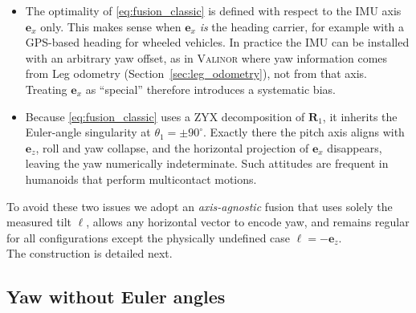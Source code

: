 \documentclass{IJCAS}
\begin{document}
\begin{itemize}[leftmargin=0em]
\item The optimality of \eqref{eq:fusion_classic} is defined with
      respect to the IMU axis $\boldsymbol{e}_{x}$ only.  
      This makes sense when $\boldsymbol{e}_{x}$ \emph{is} the heading
      carrier, for example with a GPS-based heading for wheeled vehicles.  
      In practice the IMU can be installed with an arbitrary yaw
      offset, as in {\scshape{Valinor}} where yaw information comes from Leg odometry
      (Section~\ref{sec:leg_odometry}), not from
      that axis.  Treating $\boldsymbol{e}_{x}$ as ``special'' therefore
      introduces a systematic bias.

\item Because \eqref{eq:fusion_classic} uses a ZYX decomposition of
      $\boldsymbol{R}_{1}$, it inherits the Euler-angle singularity at
      $\theta_{1}= \pm 90^{\circ}$.  
      Exactly there the pitch axis aligns with
      $\boldsymbol{e}_{z}$, roll and yaw collapse, and the horizontal
      projection of $\boldsymbol{e}_{x}$ disappears, leaving the yaw
      numerically indeterminate.  
      Such attitudes are frequent in humanoids that perform
      multicontact motions.
\end{itemize}
To avoid these two issues we adopt an \emph{axis-agnostic} fusion that
uses solely the measured tilt $\boldsymbol{\ell}$, allows any horizontal
vector to encode yaw, and remains regular for all configurations except
the physically undefined case $\boldsymbol{\ell}=-\boldsymbol{e}_{z}$.\\
The construction is detailed next.

\subsection{Yaw without Euler angles}
\label{sec:yaw_no_euler}
\end{document}
